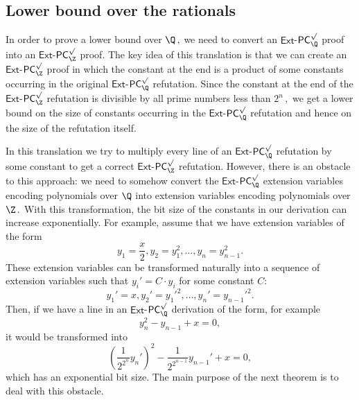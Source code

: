 \documentclass{toc}
\begin{document}
%
\subsection{Lower bound over the rationals}  %
In order to prove a lower bound over %
$\Q\,,$ %
 we need to convert an $\mathsf{Ext}$-$\mathsf{PC}^{\surd}_{\Q}$ proof into an $\mathsf{Ext}$-$\mathsf{PC}^{\surd}_{\Z}$ proof. The key idea of this translation is that we can create an $\mathsf{Ext}$-$\mathsf{PC}^{\surd}_{\Z}$ proof in which the constant at %
the end is a product of some constants occurring in the original $\mathsf{Ext}$-$\mathsf{PC}^{\surd}_{\Q}$ refutation. Since the constant at %
the end of the $\mathsf{Ext}$-$\mathsf{PC}^{\surd}_{\Z}$ refutation is divisible by all prime numbers less than %
$2^n\,,$ %
 we get a lower bound on the size of constants occurring in the $\mathsf{Ext}$-$\mathsf{PC}^{\surd}_{\Q}$ refutation and hence on the size of the refutation itself.

In this translation we try to multiply every line of an $\mathsf{Ext}$-$\mathsf{PC}^{\surd}_{\Q}$ refutation by some constant to get a correct $\mathsf{Ext}$-$\mathsf{PC}^{\surd}_{\Z}$ refutation. However, there is an obstacle to this approach: we need to somehow convert the $\mathsf{Ext}$-$\mathsf{PC}^{\surd}_{\Q}$ extension variables encoding polynomials over $\Q$ into extension variables encoding polynomials over %
$\Z\,.$ %
 With this transformation, the bit size of the constants in our derivation can increase exponentially. For example, assume that we have extension variables of the form
$$
y_1 = \frac{x}{2}, y_2 = y_1^2, \ldots, y_n = y_{n - 1}^2.
$$
These extension variables can be transformed naturally into a sequence of extension variables such that $y_i' = C \cdot y_i$ for some constant $C$: 
$$
y_1' = x, y_2' = y_1'^2, \ldots, y_n' = y_{n - 1}'^2.
$$
Then, if we have a line in an $\mathsf{Ext}$-$\mathsf{PC}^{\surd}_{\Q}$ derivation of the form, for example
$$
y_n^2 - y_{n - 1} + x = 0,
$$
it would be transformed into 
$$
\left(\frac{1}{2^{2^n}}y_n'\right)^2 - \frac{1}{2^{2^{n - 1}}}y_{n - 1}' + x = 0,
$$
which has an exponential bit size. 
%
The main purpose of the next theorem is to deal with this obstacle.
\end{document}
